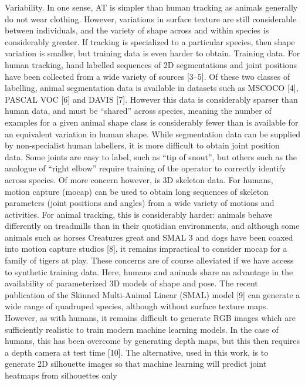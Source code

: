 Variability. In one sense, AT is simpler than human tracking as animals generally do not wear clothing. However, variations in surface texture are still
considerable between individuals, and the variety of shape across and within
species is considerably greater. If tracking is specialized to a particular species,
then shape variation is smaller, but training data is even harder to obtain.
Training data. For human tracking, hand labelled sequences of 2D segmentations and joint positions have been collected from a wide variety of sources [3–5].
Of these two classes of labelling, animal segmentation data is available in datasets
such as MSCOCO [4], PASCAL VOC [6] and DAVIS [7]. However this data is
considerably sparser than human data, and must be “shared” across species,
meaning the number of examples for a given animal shape class is considerably
fewer than is available for an equivalent variation in human shape. While segmentation data can be supplied by non-specialist human labellers, it is more
difficult to obtain joint position data. Some joints are easy to label, such as “tip
of snout”, but others such as the analogue of “right elbow” require training of
the operator to correctly identify across species.
Of more concern however, is 3D skeleton data. For humans, motion capture
(mocap) can be used to obtain long sequences of skeleton parameters (joint
positions and angles) from a wide variety of motions and activities. For animal
tracking, this is considerably harder: animals behave differently on treadmills
than in their quotidian environments, and although some animals such as horses
Creatures great and SMAL 3
and dogs have been coaxed into motion capture studios [8], it remains impractical
to consider mocap for a family of tigers at play.
These concerns are of course alleviated if we have access to synthetic training
data. Here, humans and animals share an advantage in the availability of parameterized 3D models of shape and pose. The recent publication of the Skinned
Multi-Animal Linear (SMAL) model [9] can generate a wide range of quadruped
species, although without surface texture maps. However, as with humans, it
remains difficult to generate RGB images which are sufficiently realistic to train
modern machine learning models. In the case of humans, this has been overcome
by generating depth maps, but this then requires a depth camera at test time [10].
The alternative, used in this work, is to generate 2D silhouette images so that
machine learning will predict joint heatmaps from silhouettes only

